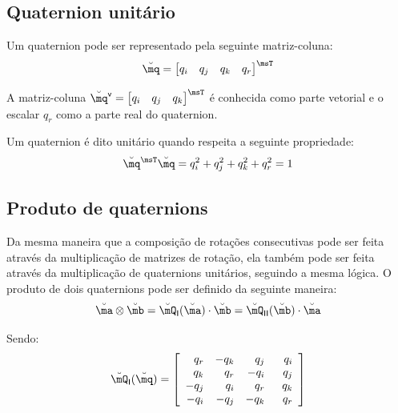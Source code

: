 \documentclass[]{politex}
\begin{document}
\subsection{Quaternion unitário}
Um quaternion pode ser representado pela seguinte matriz-coluna:
\begin{equation}
\breve{\mq} = \begin{bmatrix}
q_i & q_j & q_k & q_r 
\end{bmatrix}^\msT
\end{equation}

A matriz-coluna $\breve{\mq}^\mathsf{v} = \begin{bmatrix} q_i & q_j & q_k \end{bmatrix}^\msT$ é conhecida como parte vetorial e o escalar $q_r$ como a parte real do quaternion.

Um quaternion é dito unitário quando respeita a seguinte propriedade:
\begin{equation}
\breve{\mq}^\msT \breve{\mq} = 
q_i^2 + q_j^2 + q_k^2 + q_r^2 = 1
\end{equation}


\subsection{Produto de quaternions}

Da mesma maneira que a composição de rotações consecutivas pode ser feita através da multiplicação de matrizes de rotação, ela também pode ser feita através da multiplicação de quaternions unitários, seguindo a mesma lógica. O produto de dois quaternions pode ser definido da seguinte maneira:
\begin{equation} \label{eq:ProdQuat}
\breve{\ma} \otimes \breve{\mb} = \breve{\mQ}_{\mathsf{I}} (\breve{\ma}) \cdot \breve{\mb} = \breve{\mQ}_{\mathsf{I}\mathsf{I}} (\breve{\mb}) \cdot \breve{\ma}
\end{equation}

Sendo:
\begin{equation} \label{eq:ProdQuat1}
\breve{\mQ}_{\mathsf{I}} (\breve{\mq}) =
\begin{bmatrix}
\begin{array}{rrrr}
q_r & -q_k & q_j & \;\; q_i \\
q_k & q_r & -q_i & \;\; q_j \\
-q_j & q_i & q_r & \;\; q_k \\
-q_i & -q_j & - q_k & \;\; q_r
\end{array}
\end{bmatrix}
\end{equation}
\end{document}

